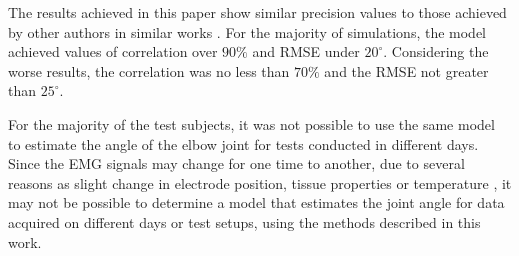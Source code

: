 \documentclass[letterpaper, 10 pt, conference]{ieeeconf}  %
\begin{document}
\begin{changemargin}{10cm}{0cm}

The results achieved in this paper show similar precision values to those achieved by other authors in similar works \cite{Pang2015165,Liu1999391,Rahmatian2016158,Mamikoglu2016785}. For the majority of simulations, the model achieved values of correlation over $90\%$ and RMSE under $20^\circ$. Considering the worse results, the correlation was no less than $70\%$ and the RMSE not greater than $25^\circ$.





For the majority of the test subjects, it was not possible to use the same model to estimate the angle of the elbow joint for tests conducted in different days. Since the EMG signals may change for one time to another, due to several reasons as slight change in electrode position, tissue properties or temperature \cite{soderberg1975}, it may not be possible to determine a model that estimates the joint angle for data acquired on different days or test setups, using the methods described in this work.

\addtolength{\textheight}{-4.5cm}   %


\end{changemargin}
\end{document}
